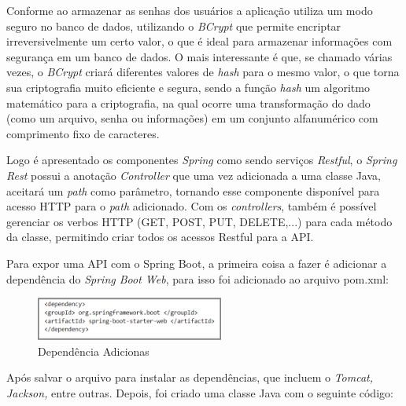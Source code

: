    Conforme \cite{vale} ao armazenar as senhas dos usuários a aplicação utiliza um modo seguro no banco de dados, utilizando o \textit{BCrypt} que permite encriptar irreversivelmente um certo valor, o que é ideal para armazenar informações com segurança em um banco de dados. O mais interessante é que, se chamado várias vezes, o \textit{BCrypt} criará diferentes valores de \textit{hash} para o mesmo valor, o que torna sua criptografia muito eficiente e segura, sendo a função \textit{hash} um algoritmo matemático para a criptografia, na qual ocorre uma transformação do dado (como um arquivo, senha ou informações) em um conjunto alfanumérico com comprimento fixo de caracteres.
    
    
    Logo é apresentado os componentes \textit{Spring} como sendo serviços \textit{Restful}, o \textit{Spring Rest} possui a anotação \textit{Controller} que uma vez adicionada a uma classe Java, aceitará um \textit{path} como parâmetro, tornando esse componente disponível para acesso HTTP para o \textit{path} adicionado. Com os \textit{controllers}, também é possível gerenciar os verbos HTTP (GET, POST, PUT, DELETE,...) para cada método da classe, permitindo criar todos os acessos Restful para a API.
   
    Para expor uma API com o Spring Boot, a primeira coisa a fazer é adicionar a dependência do \textit{Spring Boot Web}, para isso foi adicionado ao arquivo pom.xml:
    

    \begin{figure}[h]
    \centering
    \includegraphics[width=0.55\textwidth]{./img/Dependência.png}
    \caption{Dependência Adicionas}
    \label{fig:Dependência}
    \end{figure}
    
    Após salvar o arquivo para instalar as dependências, que incluem o \textit{Tomcat, Jackson,} entre outras. Depois, foi criado uma classe Java com o seguinte código:
    
